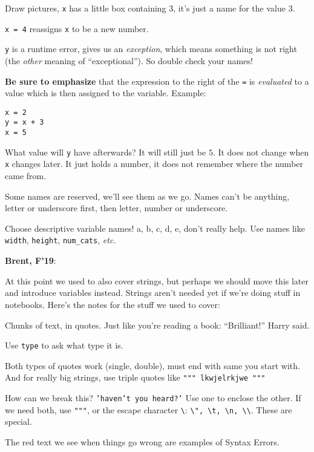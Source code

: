 \documentclass{article}
\newcommand{\etc}{\emph{etc.}\xspace}
\newenvironment{reflect}[1]
{
  \noindent
  \begin{lrbox}{\reflectbox}
    \begin{minipage}[t]{\textwidth}
      \textbf{#1}:
}{
    \end{minipage}
  \end{lrbox}
  \fbox{\usebox{\reflectbox}}
}
\begin{document}
\begin{itemize}

  Draw pictures, \texttt{x} has a little box containing $3$, it's just a
  name for the value $3$.

  \texttt{x = 4} reassigns \texttt{x} to be a new number.

  \texttt{y} is a runtime error, gives us an \emph{exception}, which
  means something is not right (the \emph{other} meaning of
  ``exceptional''). So double check your names!

  \textbf{Be sure to emphasize} that the expression to the right of
  the \texttt{=} is \emph{evaluated} to a value which is then assigned
  to the variable.  Example:
\begin{verbatim}
x = 2
y = x + 3
x = 5
\end{verbatim}
  What value will \texttt{y} have afterwards?  It will still just be
  $5$.  It does not change when \texttt{x} changes later.  It just
  holds a number, it does not remember where the number came from.

  Some names are reserved, we'll see them as we go.
  Names can't be anything, letter or underscore first, then letter,
  number or underscore.

  Choose descriptive variable names! a, b, c, d, e, don't really help.
  Use names like \texttt{width}, \texttt{height},
  \texttt{num\_cats}, \etc

\end{itemize}


\begin{reflect}{Brent, F'19}
  At this point we used to also cover strings, but perhaps we should
  move this later and introduce variables instead.  Strings aren't
  needed yet if we're doing stuff in notebooks.  Here's the notes for
  the stuff we used to cover: \medskip

  Chunks of text, in quotes. Just like you're reading a book:
  ``Brilliant!'' Harry said.

  Use \texttt{type} to ask what type it is.

  Both types of quotes work (single, double), must end with same you
  start with. And for really big strings, use triple quotes like
  \texttt{""" lkwjelrkjwe """}

  How can we break this? \texttt{'haven't you heard?'}  Use one to
  enclose the other.  If we need both, use \texttt{"""}, or the escape
  character \texttt{\textbackslash}: \texttt{\textbackslash ", \textbackslash t,
    \textbackslash n, \textbackslash\textbackslash}. These are special.

  The red text we see when things go wrong are examples of Syntax
  Errors.

\end{reflect}
\end{document}
